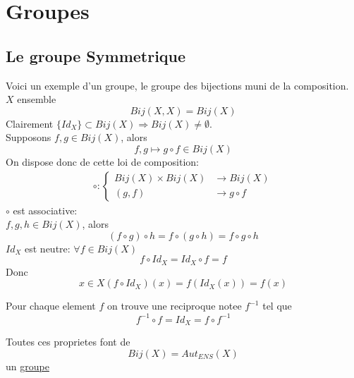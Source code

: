 \documentclass[../main.tex]{subfiles}
\begin{document}
\chapter{Groupes}
\section{Le groupe Symmetrique}
Voici un exemple d'un groupe, le groupe des bijections muni de la composition.\\
$X$ ensemble
\[ 
	Bij(X,X) = Bij(X)
\]
Clairement $\{ Id_X \} \subset Bij(X) \Rightarrow Bij(X) \neq \emptyset $.\\
Supposons $f,g \in Bij(X)$, alors
\[ 
	f,g \mapsto g \circ f \in Bij(X)
\]
On dispose donc de cette loi de composition:
\begin{align*}
\circ: 
\begin{cases}
	Bij(X) \times Bij(X) &\longrightarrow Bij(X)\\
	( g,f) &\longrightarrow g \circ f
\end{cases}
\end{align*}
 $\circ$ est associative:\\
 $f,g,h \in Bij(X)$, alors
 \[ 
	 ( f \circ g) \circ h = f \circ ( g \circ h) = f \circ g \circ h
 \]
 $Id_X$ est neutre: $\forall f \in Bij(X)$ 
 \[ 
	 f \circ Id_X = Id_X \circ f = f
 \]
Donc
\[ 
	x \in X (f \circ Id_X)(x) = f(Id_X(x)) = f(x)
\]

Pour chaque element $f$ on trouve une reciproque notee $f^{-1}$ tel que
\[ 
f^{-1} \circ f = Id_X= f \circ f^{-1}
\]

Toutes ces proprietes font de 
\[ 
	Bij(X) = Aut_{ENS}(X)
\]
un \underline{groupe}
\end{document}
